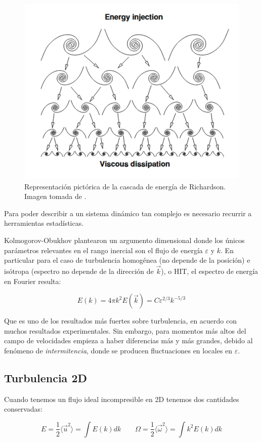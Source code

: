 \begin{figure}[!th]
	\centering
	\includegraphics[width=0.53\linewidth]{Figures/Antecedentes_teoricos/Energy_cascade}
	\caption{Representación pictórica de la cascada de energía de Richardson. Imagen tomada de \cite{nazarenkoWaveTurbulence2011}.}
	\label{fig:energycascade}
\end{figure}


Para poder describir a un sistema dinámico tan complejo es necesario recurrir a herramientas estadísticas. 


Kolmogorov-Obukhov plantearon un argumento dimensional donde los únicos parámetros relevantes en el rango inercial son el flujo de energía $\varepsilon$ y $k$. En particular para el caso de turbulencia homogénea (no depende de la posición) e isótropa (espectro no depende de la dirección de $\vec k$), o HIT, el espectro de energía en Fourier resulta:

\begin{equation}
	E(k) = 4\pi k^2E(\vec k) = C\varepsilon^{2/3}k^{-5/3}
	\label{eq:Kolmogorov_5_3}
\end{equation}

Que es uno de los resultados más fuertes sobre turbulencia, en acuerdo con muchos resultados experimentales. Sin embargo, para momentos más altos del campo de velocidades empieza a haber diferencias más y más grandes, debido al fenómeno de \textit{intermitencia}, donde se producen fluctuaciones en locales en $\varepsilon$.

\subsection*{Turbulencia 2D}
Cuando tenemos un flujo ideal incompresible en 2D tenemos dos cantidades conservadas:

\begin{equation}
	E = \frac{1}{2}\langle \vec u^2 \rangle = \int E(k) dk \qquad \Omega = \frac{1}{2} \langle \vec \omega^2 \rangle = \int k^2 E(k) dk
\end{equation}

